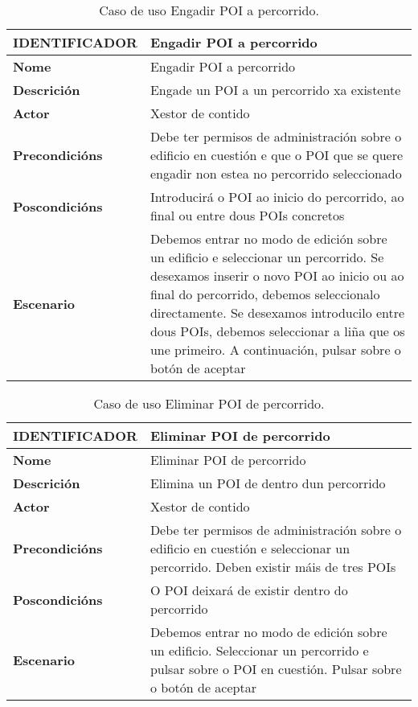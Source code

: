 \begin{table}[tbh]
	\footnotesize
	\centering
	\begin{tabular}{|l|p{10cm}|}
		\hline 
		\textbf{IDENTIFICADOR}	& \textbf{Engadir POI a percorrido} \\ 
		\hline 
		\textbf{Nome} & Engadir POI a percorrido \\ 
		\hline 
		\textbf{Descrición} & Engade un POI a un percorrido xa existente \\ 
		\hline 
		\textbf{Actor} & Xestor de contido \\ 
		\hline 
		\textbf{Precondicións} & Debe ter permisos de administración sobre o edificio en cuestión e que o POI que se quere engadir non estea no percorrido seleccionado \\ 
		\hline 
		\textbf{Poscondicións} & Introducirá o POI ao inicio do percorrido, ao final ou entre dous POIs concretos \\ 
		\hline 
		\textbf{Escenario} & Debemos entrar no modo de edición sobre un edificio e seleccionar un percorrido. Se desexamos inserir o novo POI ao inicio ou ao final do percorrido, debemos seleccionalo directamente. Se desexamos introducilo entre dous POIs, debemos seleccionar a liña que os une primeiro. A continuación, pulsar sobre o botón de aceptar \\ 
		\hline 
	\end{tabular}
	\caption{Caso de uso Engadir POI a percorrido.}
	\label{tab:cuEngadirPOIPercorrido}
\end{table}

\begin{table}[tbh]
	\footnotesize
	\centering
	\begin{tabular}{|l|p{10cm}|}
		\hline 
		\textbf{IDENTIFICADOR}	& \textbf{Eliminar POI de percorrido} \\ 
		\hline 
		\textbf{Nome} & Eliminar POI de percorrido \\ 
		\hline 
		\textbf{Descrición} & Elimina un POI de dentro dun percorrido \\ 
		\hline 
		\textbf{Actor} & Xestor de contido \\ 
		\hline 
		\textbf{Precondicións} & Debe ter permisos de administración sobre o edificio en cuestión e seleccionar un percorrido. Deben existir máis de tres POIs \\ 
		\hline 
		\textbf{Poscondicións} & O POI deixará de existir dentro do percorrido \\ 
		\hline 
		\textbf{Escenario} & Debemos entrar no modo de edición sobre un edificio. Seleccionar un percorrido e pulsar sobre o POI en cuestión. Pulsar sobre o botón de aceptar \\ 
		\hline 
	\end{tabular}
	\caption{Caso de uso Eliminar POI de percorrido.}
	\label{tab:cuEliminarPOIPercorrido}
\end{table}

